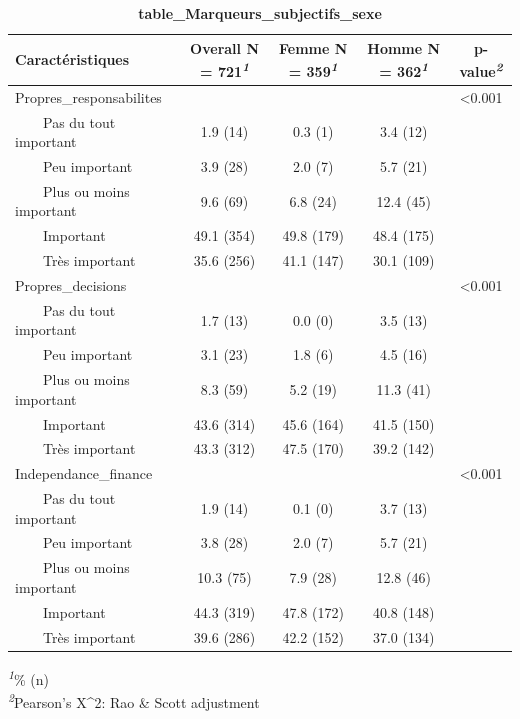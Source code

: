 \documentclass[
]{article}
\begin{document}
\begin{table}[!t]
\caption{\label{tab:unnamed-chunk-80}\textbf{table\_Marqueurs\_subjectifs\_sexe}} 
\fontsize{12.0pt}{14.4pt}\selectfont
\begin{tabular*}{\linewidth}{@{\extracolsep{\fill}}lcccc}
\toprule
\textbf{Caractéristiques} & \textbf{Overall}  N = 721\textsuperscript{\textit{1}} & \textbf{Femme}  N = 359\textsuperscript{\textit{1}} & \textbf{Homme}  N = 362\textsuperscript{\textit{1}} & \textbf{p-value}\textsuperscript{\textit{2}} \\ 
\midrule\addlinespace[2.5pt]
Propres\_responsabilites &  &  &  & <0.001 \\ 
    Pas du tout important & 1.9 (14) & 0.3 (1) & 3.4 (12) &  \\ 
    Peu important & 3.9 (28) & 2.0 (7) & 5.7 (21) &  \\ 
    Plus ou moins important & 9.6 (69) & 6.8 (24) & 12.4 (45) &  \\ 
    Important & 49.1 (354) & 49.8 (179) & 48.4 (175) &  \\ 
    Très important & 35.6 (256) & 41.1 (147) & 30.1 (109) &  \\ 
Propres\_decisions &  &  &  & <0.001 \\ 
    Pas du tout important & 1.7 (13) & 0.0 (0) & 3.5 (13) &  \\ 
    Peu important & 3.1 (23) & 1.8 (6) & 4.5 (16) &  \\ 
    Plus ou moins important & 8.3 (59) & 5.2 (19) & 11.3 (41) &  \\ 
    Important & 43.6 (314) & 45.6 (164) & 41.5 (150) &  \\ 
    Très important & 43.3 (312) & 47.5 (170) & 39.2 (142) &  \\ 
Independance\_finance &  &  &  & <0.001 \\ 
    Pas du tout important & 1.9 (14) & 0.1 (0) & 3.7 (13) &  \\ 
    Peu important & 3.8 (28) & 2.0 (7) & 5.7 (21) &  \\ 
    Plus ou moins important & 10.3 (75) & 7.9 (28) & 12.8 (46) &  \\ 
    Important & 44.3 (319) & 47.8 (172) & 40.8 (148) &  \\ 
    Très important & 39.6 (286) & 42.2 (152) & 37.0 (134) &  \\ 
\bottomrule
\end{tabular*}
\begin{minipage}{\linewidth}
\textsuperscript{\textit{1}}\% (n)\\
\textsuperscript{\textit{2}}Pearson's X\^{}2: Rao \& Scott adjustment\\
\end{minipage}
\end{table}
\end{document}
